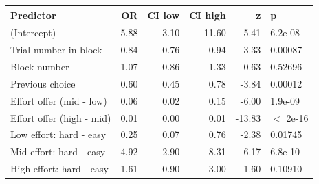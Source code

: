 \begin{table}[ht]
\centering
\begin{tabular}{lrrrrl}
  \hline
Predictor & OR & CI low & CI high & z & p \\ 
  \hline
(Intercept) & 5.88 & 3.10 & 11.60 & 5.41 & 6.2e-08 \\ 
  Trial number in block & 0.84 & 0.76 & 0.94 & -3.33 & 0.00087 \\ 
  Block number & 1.07 & 0.86 & 1.33 & 0.63 & 0.52696 \\ 
  Previous choice & 0.60 & 0.45 & 0.78 & -3.84 & 0.00012 \\ 
  Effort offer (mid - low) & 0.06 & 0.02 & 0.15 & -6.00 & 1.9e-09 \\ 
  Effort offer (high - mid) & 0.01 & 0.00 & 0.01 & -13.83 & $<$ 2e-16 \\ 
  Low effort: hard - easy & 0.25 & 0.07 & 0.76 & -2.38 & 0.01745 \\ 
  Mid effort: hard - easy & 4.92 & 2.90 & 8.31 & 6.17 & 6.8e-10 \\ 
  High effort: hard - easy & 1.61 & 0.90 & 3.00 & 1.60 & 0.10910 \\ 
   \hline
\end{tabular}
\end{table}
